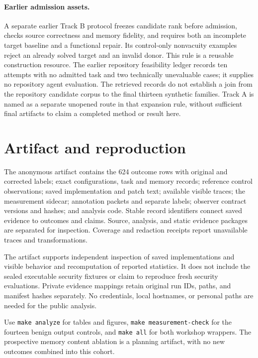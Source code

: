 \paragraph{Earlier admission assets.}
A separate earlier Track B protocol freezes candidate rank before admission, checks source correctness and memory fidelity, and requires both an incomplete target baseline and a functional repair. Its control-only nonvacuity examples reject an already solved target and an invalid donor. This rule is a reusable construction resource. The earlier repository feasibility ledger records ten attempts with no admitted task and two technically unevaluable cases; it supplies no repository agent evaluation. The retrieved records do not establish a join from the repository candidate corpus to the final thirteen synthetic families. Track A is named as a separate unopened route in that expansion rule, without sufficient final artifacts to claim a completed method or result here.

\section{Artifact and reproduction}
The anonymous artifact contains the 624 outcome rows with original and corrected labels; exact configurations, task and memory records; reference control observations; saved implementation and patch text; available visible traces; the measurement sidecar; annotation packets and separate labels; observer contract versions and hashes; and analysis code. Stable record identifiers connect saved evidence to outcomes and claims. Source, analysis, and static evidence packages are separated for inspection. Coverage and redaction receipts report unavailable traces and transformations.

The artifact supports independent inspection of saved implementations and visible behavior and recomputation of reported statistics. It does not include the sealed executable security fixtures or claim to reproduce fresh security evaluations. Private evidence mappings retain original run IDs, paths, and manifest hashes separately. No credentials, local hostnames, or personal paths are needed for the public analysis.

Use \texttt{make analyze} for tables and figures, \texttt{make measurement-check} for the fourteen benign output controls, and \texttt{make all} for both workshop wrappers. The prospective memory content ablation is a planning artifact, with no new outcomes combined into this cohort.

